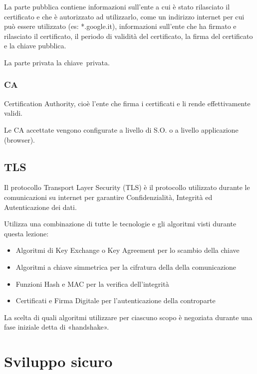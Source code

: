 \documentclass[
]{article}
\providecommand{\tightlist}{%
  \setlength{\itemsep}{0pt}\setlength{\parskip}{0pt}}
\begin{document}
{}

{La parte pubblica contiene informazioni sull'ente a cui è stato
rilasciato il certificato e che è autorizzato ad utilizzarlo, come un
indirizzo internet per cui può essere utilizzato (es: *.google.it),
informazioni sull'ente che ha firmato e rilasciato il certificato, il
periodo di validità del certificato, la firma del certificato e la
chiave pubblica.}

{La parte }{privata la chiave}{~privata.}

\subsubsection{\texorpdfstring{{CA}}{CA}}\label{h.ffxzrw9q9me2}

{Certification Authority, cioè l'ente che firma i certificati e li rende
effettivamente validi.}

{Le CA accettate vengono configurate a livello di S.O. o a livello
applicazione (browser).}

\subsection{\texorpdfstring{{TLS}}{TLS}}\label{h.2crh50vabqhw}

{Il protocollo Transport Layer Security (TLS) è il protocollo utilizzato
durante le comunicazioni su internet per garantire Confidenzialità,
Integrità ed Autenticazione dei dati. }

{Utilizza una combinazione di tutte le tecnologie e gli algoritmi visti
durante questa lezione: }

\begin{itemize}
\tightlist
\item
  {Algoritmi di Key Exchange o Key Agreement per lo scambio della chiave
  }
\item
  {Algoritmi a chiave simmetrica per la cifratura della della
  comunicazione }
\item
  {Funzioni Hash e MAC per la verifica dell'integrità }
\item
  {Certificati e Firma Digitale per l'autenticazione della controparte }
\end{itemize}

{La scelta di quali algoritmi utilizzare per ciascuno scopo è negoziata
durante una fase iniziale detta di «handshake». }

\section{\texorpdfstring{{Sviluppo
sicuro}}{Sviluppo sicuro}}\label{h.qer33z8hl1ds}
\end{document}
